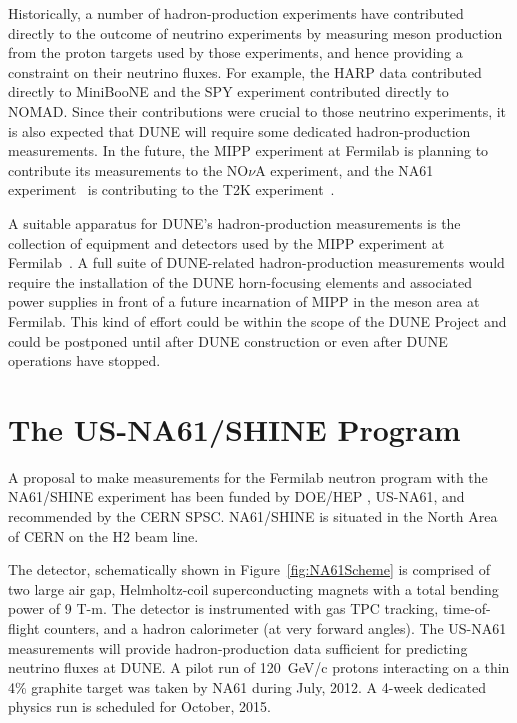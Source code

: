 Historically, a number of hadron-production experiments have
contributed directly to the outcome of neutrino experiments
by measuring meson production from the proton targets used
by those experiments, and hence providing a constraint on their neutrino fluxes. 
For example, the HARP data\cite{ref:HARP} contributed directly to
MiniBooNE and the SPY\cite{ref:SPY} experiment contributed directly to
NOMAD. Since their contributions were crucial to those neutrino experiments, 
it is also expected that DUNE will require some dedicated hadron-production measurements.
In the future, the MIPP experiment at Fermilab is planning to contribute its
measurements to the NO$\nu$A experiment, and the NA61
experiment~\cite{Abgrall:2011ae, Abgrall:2011ts} is contributing to the T2K
experiment~\cite{Abe:2012av}.

A suitable apparatus for DUNE's hadron-production measurements
is the collection of equipment and detectors used by the MIPP experiment at Fermilab~\cite{Isenhower:2006zp}.   
A full suite of DUNE-related
hadron-production measurements would require the installation of the DUNE horn-focusing
elements and associated power supplies in front of a future
incarnation of MIPP in the meson area at Fermilab.
This kind of effort could be within the scope of the DUNE Project and could be postponed
until after DUNE construction or even after DUNE operations have
stopped. 

\section{The US-NA61/SHINE Program}
\label{sec:nd-external-usna61}

A proposal to make measurements for the Fermilab neutron program with the NA61/SHINE experiment has been funded by DOE/HEP \cite{ref:NA61Proposal,ref:NA61Addendum} , US-NA61, and recommended by the CERN SPSC. NA61/SHINE is situated in the North Area of CERN on the H2 beam line. 

The detector, schematically shown in Figure~\ref{fig:NA61Scheme} is comprised of two large air gap, Helmholtz-coil superconducting magnets with a total bending power of 9 T-m. The detector is instrumented with gas TPC tracking, time-of-flight counters, and a hadron calorimeter (at very forward angles). The US-NA61 measurements will provide hadron-production data sufficient for predicting neutrino fluxes at DUNE. A pilot run of 120~GeV/c protons interacting on a thin 4\% graphite target was taken by NA61 during July, 2012. A 4-week dedicated physics run is scheduled for October, 2015.

